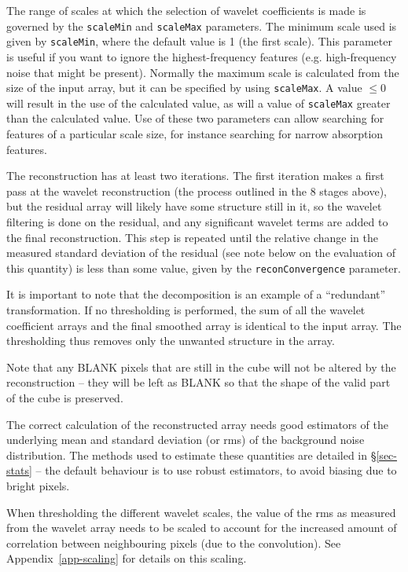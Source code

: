The range of scales at which the selection of wavelet coefficients is
made is governed by the \texttt{scaleMin} and \texttt{scaleMax}
parameters. The minimum scale used is given by \texttt{scaleMin},
where the default value is 1 (the first scale). This parameter is
useful if you want to ignore the highest-frequency features
(e.g. high-frequency noise that might be present). Normally the
maximum scale is calculated from the size of the input array, but it
can be specified by using \texttt{scaleMax}. A value $\le0$ will
result in the use of the calculated value, as will a value of
\texttt{scaleMax} greater than the calculated value. Use of these two
parameters can allow searching for features of a particular scale
size, for instance searching for narrow absorption features.

The reconstruction has at least two iterations. The first iteration
makes a first pass at the wavelet reconstruction (the process outlined
in the 8 stages above), but the residual array will likely have some
structure still in it, so the wavelet filtering is done on the
residual, and any significant wavelet terms are added to the final
reconstruction. This step is repeated until the relative change in the
measured standard deviation of the residual (see note below on the
evaluation of this quantity) is less than some value, given by the
\texttt{reconConvergence} parameter.

It is important to note that the \atrous decomposition is an example
of a ``redundant'' transformation. If no thresholding is performed,
the sum of all the wavelet coefficient arrays and the final smoothed
array is identical to the input array. The thresholding thus removes
only the unwanted structure in the array.

Note that any BLANK pixels that are still in the cube will not be
altered by the reconstruction -- they will be left as BLANK so that
the shape of the valid part of the cube is preserved.


The correct calculation of the reconstructed array needs good
estimators of the underlying mean and standard deviation (or rms) of
the background noise distribution. The methods used to estimate these
quantities are detailed in \S\ref{sec-stats} -- the default behaviour
is to use robust estimators, to avoid biasing due to bright pixels.

When thresholding the different wavelet scales, the value of the rms
as measured from the wavelet array needs to be scaled to account for
the increased amount of correlation between neighbouring pixels (due
to the convolution). See Appendix~\ref{app-scaling} for details on
this scaling.

